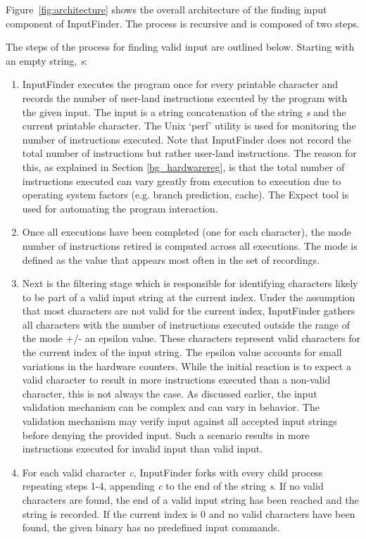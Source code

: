 \documentclass[10pt,twocolumn]{article}
\def \tool {InputFinder}
\begin{document}
Figure~\ref{fig:architecture} shows the overall architecture of the finding input component of \tool{}.
The process is recursive and is composed of two steps.

The steps of the process for finding valid input are outlined below. Starting with an empty string, \textit{s}:
\begin{enumerate}
\item \tool{} executes the program once for every printable character and records the number of user-land instructions executed by the program with the given input. The input is a string concatenation of the string \textit{s} and the current printable character. The Unix `perf' utility is used for monitoring the number of instructions executed. Note that \tool{} does not record the total number of instructions but rather user-land instructions. The reason for this, as explained in Section \ref{bg_hardwarereg}, is that the total number of instructions executed can vary greatly from execution to execution due to operating system factors (e.g. branch prediction, cache). The Expect tool is used for automating the program interaction.
\item Once all executions have been completed (one for each character), the mode number of instructions retired is computed across all executions. The mode is defined as the value that appears most often in the set of recordings.
\item Next is the filtering stage which is responsible for identifying characters likely to be part of a valid input string at the current index. Under the assumption that most characters are not valid for the current index, \tool{} gathers all characters with the number of instructions executed outside the range of the mode +/- an epsilon value. These characters represent valid characters for the current index of the input string. The epsilon value accounts for small variations in the hardware counters. While the initial reaction is to expect a valid character to result in more instructions executed than a non-valid character, this is not always the case. As discussed earlier, the input validation mechanism can be complex and can vary in behavior. The validation mechanism may verify input against all accepted input strings before denying the provided input. Such a scenario results in more instructions executed for invalid input than valid input.
\item For each valid character \textit{c}, \tool{} forks with every child process repeating steps 1-4, appending \textit{c} to the end of the string \textit{s}. If no valid characters are found, the end of a valid input string has been reached and the string is recorded. If the current index is 0 and no valid characters have been found, the given binary has no predefined input commands.
\end{enumerate}
\end{document}
